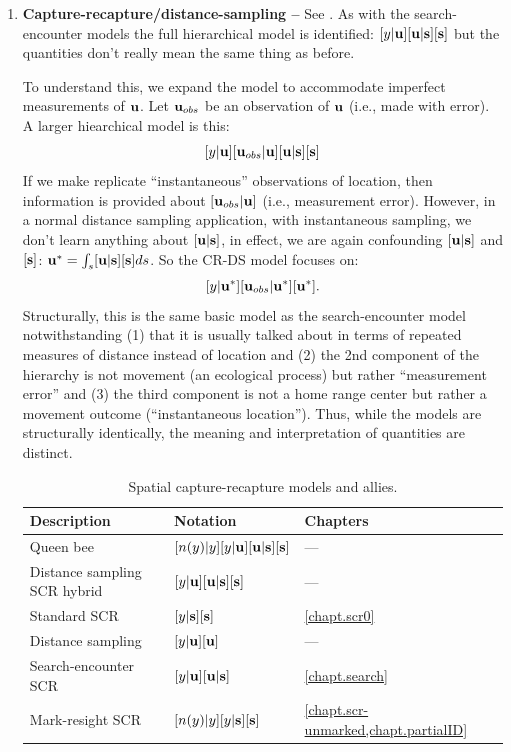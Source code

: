 \begin{enumerate}
\item {\bf Capture-recapture/distance-sampling -- } See
  \citet{borchers_etal:1998}. As with the search-encounter models the
full hierarchical model is identified:
$[y|{\bf u}][{\bf u}|{\bf s}][{\bf s}]$ but the quantities don't
really mean the same thing as before.

To understand this, we expand the model to accommodate imperfect
measurements of ${\bf u}$. Let ${\bf u}_{obs}$ be an observation of
${\bf u}$ (i.e., made with error). A larger hiearchical model is this:
\[
[y|{\bf u}][{\bf u}_{obs}|{\bf u}][{\bf u}|{\bf s}][{\bf s}]
\]
If we make replicate ``instantaneous'' observations of location, then
information is provided about
 $[{\bf u}_{obs}|{\bf u}]$ (i.e., measurement error). However, in a normal
 distance sampling application, with instantaneous sampling, we don't
 learn anything about $[{\bf u}|{\bf s}]$,
in effect, we are again confounding $[{\bf u}|{\bf s}]$ and $[{\bf
  s}]$: ${\bf u}^{*} = \int_{s} [{\bf u}|{\bf s}][{\bf s}] ds$. So the CR-DS model focuses on:
\[
[y|{\bf u}^{*}][{\bf u}_{obs}|{\bf u}^{*}][{\bf u}^{*}].
\]
Structurally, this is the same basic model as the search-encounter
model notwithstanding (1) that it is usually talked about in terms of
repeated measures of distance instead of location and (2) the 2nd
component of the hierarchy is not movement (an ecological process) but
rather ``measurement error'' and (3) the third component is not a home
range center but rather a movement outcome (``instantaneous
location'').  Thus, while the models are structurally identically, the
meaning and interpretation of quantities are distinct.


\begin{table}
  \centering
  \caption{Spatial capture-recapture models and allies.}
  \begin{tabular}{lll}
    \hline
    Description & Notation & Chapters \\
    \hline
    Queen bee            & $[n(y)|y][y|{\bf u}][{\bf u}|{\bf s}][{\bf s}]$ & --- \\
    Distance sampling SCR hybrid & $[y|{\bf u}][{\bf u}|{\bf s}][{\bf s}]$ & --- \\
    Standard SCR         & $[y|{\bf s}][{\bf s}]$ & \ref{chapt.scr0} \\
    Distance sampling    & $[y|{\bf u}][{\bf u}]$ & --- \\
    Search-encounter SCR & $[y|{\bf u}][{\bf u}|{\bf s}]$ & \ref{chapt.search} \\
    Mark-resight SCR     & $[n(y)|y][y|{\bf s}][{\bf s}]$ & \ref{chapt.scr-unmarked,chapt.partialID} \\
    \hline
  \end{tabular}
  \label{modeling.tab.fam}
\end{table}



\end{enumerate}
